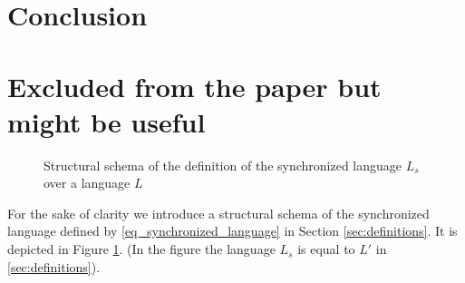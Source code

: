 \documentclass[a4paper, 10pt, conference]{ieeeconf} \IEEEoverridecommandlockouts
\begin{document}
\section{Conclusion}
\label{sec:Conclusion}





\newpage
\section{Excluded from the paper but might be useful}
\begin{figure}[ht]
\centering

\caption{Structural schema of the definition of the synchronized language
$L_s$ over a language $L$}
\label{fig_partitioning_synch}
\end{figure}

For the sake of clarity we introduce a structural schema of the
synchronized language defined by \ref{eq_synchronized_language} in Section
\ref{sec:definitions}. It is depicted in Figure \ref{fig_partitioning_synch}.
(In the figure the language $L_s$ is equal to $L'$ in \ref{sec:definitions}).
\end{document}
